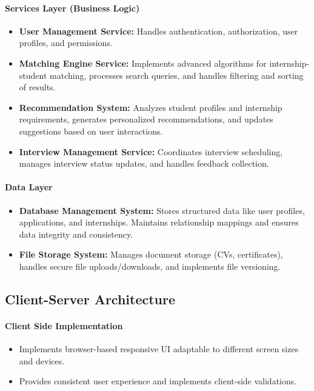 \paragraph{Services Layer (Business Logic)}
\begin{itemize}
    \item \textbf{User Management Service:} Handles authentication, authorization, user profiles, and permissions.
    \item \textbf{Matching Engine Service:} Implements advanced algorithms for internship-student matching, processes search queries, and handles filtering and sorting of results.
    \item \textbf{Recommendation System:} Analyzes student profiles and internship requirements, generates personalized recommendations, and updates suggestions based on user interactions.
    \item \textbf{Interview Management Service:} Coordinates interview scheduling, manages interview status updates, and handles feedback collection.
\end{itemize}

\paragraph{Data Layer}
\begin{itemize}
    \item \textbf{Database Management System:} Stores structured data like user profiles, applications, and internships. Maintains relationship mappings and ensures data integrity and consistency.
    \item \textbf{File Storage System:} Manages document storage (CVs, certificates), handles secure file uploads/downloads, and implements file versioning.
\end{itemize}

\subsection{Client-Server Architecture}
\paragraph{Client Side Implementation}
\begin{itemize}
    \item Implements browser-based responsive UI adaptable to different screen sizes and devices.
    \item Provides consistent user experience and implements client-side validations.
\end{itemize}

